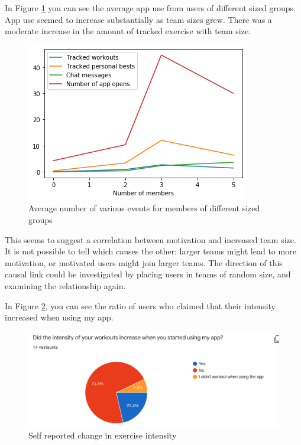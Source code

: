 \documentclass{l4proj}
\begin{document}
In Figure \ref{fig:exercises} you can see the average app use from users of different sized groups. App use seemed to increase substantially as team sizes grew. There was a moderate increase in the amount of tracked exercise with team size.
\begin{figure}[H]
    \centering
    \includegraphics[width=1.0\linewidth]{data/activity.png}    
    \caption{Average number of various events for members of different sized groups}
    \label{fig:exercises} 
\end{figure}
This seems to suggest a correlation between motivation and increased team size. It is not possible to tell which causes the other: larger teams might lead to more motivation, or motivated users might join larger teams. The direction of this causal link could be investigated by placing users in teams of random size, and examining the relationship again.


In Figure \ref{fig:intensity}, you can see the ratio of users who claimed that their intensity increased when using my app.
\begin{figure}[H]
    \centering
    \includegraphics[width=1.0\linewidth]{exercise_intensity.png}    
    \caption{Self reported change in exercise intensity}
    \label{fig:intensity} 
\end{figure}
\end{document}
